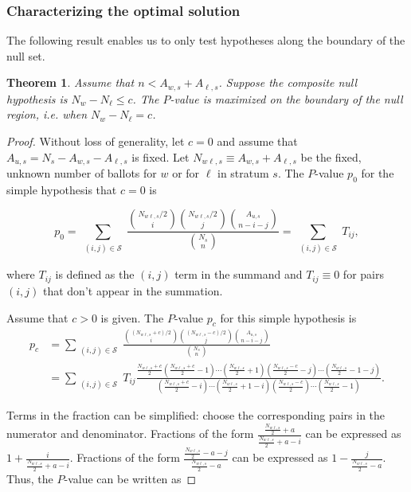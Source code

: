 \documentclass[runningheads]{llncs}
\newtheorem{thm}{Theorem}
\begin{document}
\subsubsection{Characterizing the optimal solution}
The following result enables us to only test hypotheses along the boundary of the null set.

\begin{thm}
Assume that $n < A_{w,s}+A_{\ell,s}$.
Suppose the composite null hypothesis is $N_w - N_\ell \leq c$.
The $P$-value is maximized on the boundary of the null region, i.e. when $N_w - N_\ell = c$.
\end{thm}

\begin{proof}
Without loss of generality, let $c=0$ and assume that $A_{u,s}=N_s - A_{w,s} - A_{\ell,s}$ is fixed.
Let $N_{w\ell, s} \equiv A_{w,s}+A_{\ell,s}$ be the fixed, unknown number of ballots for $w$ or for $\ell$ in stratum $s$.
The $P$-value $p_0$ for the simple hypothesis that $c=0$ is

\begin{equation}
  p_0 = \sum_{\substack{(i, j) \in \mathcal{S}}} \frac{ {N_{w\ell, s}/2 \choose i}{N_{w\ell, s}/2 \choose j}{A_{u,s} \choose n-i-j}}{{N_s \choose n}} =  \sum_{\substack{(i, j) \in \mathcal{S}}}T_{ij},
\end{equation}

\noindent where $T_{ij}$ is defined as the $(i, j)$ term in the summand and $T_{ij} \equiv 0$ for pairs $(i, j)$ that don't appear in the summation.

Assume that $c>0$ is given.
The $P$-value $p_c$ for this simple hypothesis is
\begin{align*}
p_c &=   \sum_{\substack{(i, j) \in \mathcal{S}}}  \frac{ {(N_{w\ell, s}+c)/2 \choose i}{(N_{w\ell, s}-c)/2 \choose j}{A_{u,s} \choose n-i-j}}{{N_s \choose n}}  \\
   &=\sum_{\substack{(i, j) \in \mathcal{S}}} T_{ij} \frac{ \frac{N_{w\ell, s}+c}{2}(\frac{N_{w\ell, s}+c}{2}-1)\cdots(\frac{N_{w\ell, s}}{2}+1) (\frac{N_{w\ell, s}-c}{2} -j)\cdots(\frac{N_{w\ell, s}}{2}-1-j) }
   {(\frac{N_{w\ell, s}+c}{2} -i)\cdots(\frac{N_{w\ell, s}}{2}+1-i)(\frac{N_{w\ell, s}-c}{2})\cdots(\frac{N_{w\ell, s}}{2}-1)}.
\end{align*}

Terms in the fraction can be simplified: choose the corresponding pairs in the numerator and denominator.
Fractions of the form $\frac{\frac{N_{w\ell, s}}{2} + a}{\frac{N_{w\ell,s}}{2} + a - i}$ can be expressed as $1 + \frac{i}{\frac{N_{w\ell,s}}{2} + a-i}$.
Fractions of the form $\frac{\frac{N_{w\ell, s}}{2}  - a - j}{\frac{N_{w\ell, s}}{2}  - a}$ can be expressed as $1 - \frac{j}{\frac{N_{w\ell, s}}{2} -a}$.
Thus, the $P$-value can be written as 


\end{proof}
\end{document}
